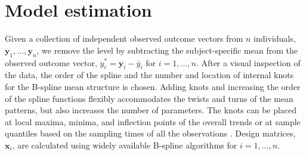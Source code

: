 \documentclass[12pt]{article}
\newcommand{\B}[0]{\mathbf}
\begin{document}
\section{Model estimation}
Given a collection of independent observed outcome vectors from $n$ individuals, $\B y_{1},...,\B y_{n}$, we remove the level by subtracting the subject-specific mean from the observed outcome vector, $y^{*}_{i} = \B y_{i} - \bar{y}_{i}$ for $i=1,...,n$. After a visual inspection of the data, the order of the spline and the number and location of internal knots for the B-spline mean structure is chosen. Adding knots and increasing the order of the spline functions flexibly accommodates the twists and turns of the mean patterns, but also increases the number of parameters. The knots can be placed at local maxima, minima, and inflection points of the overall trends \cite{eubank1999} or at sample quantiles based on the sampling times of all the observations \cite{ruppert2002}. Design matrices, $\B x_{i}$, are calculated using widely available B-spline algorithms for $i=1,...,n$. 
\end{document}
